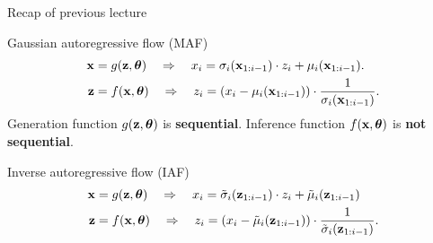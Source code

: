 

\begin{frame}
\titlepage
\end{frame}
\begin{frame}{Recap of previous lecture}
	\begin{block}{Gaussian autoregressive flow (MAF)}
		\vspace{-0.8cm}
		\begin{align*}
			\mathbf{x} &= g(\mathbf{z}, \boldsymbol{\theta}) \quad \Rightarrow \quad x_i = \sigma_i (\mathbf{x}_{1:i-1}) \cdot z_i + \mu_i(\mathbf{x}_{1:i-1}). \\
			\mathbf{z} &= f(\mathbf{x}, \boldsymbol{\theta}) \quad \Rightarrow \quad z_i = \left(x_i - \mu_i(\mathbf{x}_{1:i-1}) \right) \cdot \frac{1}{ \sigma_i (\mathbf{x}_{1:i-1})}.
		\end{align*}
		Generation function $g(\mathbf{z}, \boldsymbol{\theta})$ is \textbf{sequential}. Inference function $f(\mathbf{x}, \boldsymbol{\theta})$ is \textbf{not sequential}.
	\end{block}
	\begin{block}{Inverse autoregressive flow (IAF)}
		\vspace{-0.5cm}
		\begin{align*}
			\mathbf{x} &= g(\mathbf{z}, \boldsymbol{\theta}) \quad \Rightarrow \quad x_i = \tilde{\sigma}_i (\mathbf{z}_{1:i-1}) \cdot z_i + \tilde{\mu}_i(\mathbf{z}_{1:i-1}) \\
			\mathbf{z} &= f(\mathbf{x}, \boldsymbol{\theta}) \quad \Rightarrow \quad z_i = \left( x_i - \tilde{\mu}_i(\mathbf{z}_{1:i-1})\right) \cdot \frac{1}{\tilde{\sigma}_i (\mathbf{z}_{1:i-1}) }.
		\end{align*}
		\vspace{-0.3cm}
	\end{block}
	
\end{frame}
